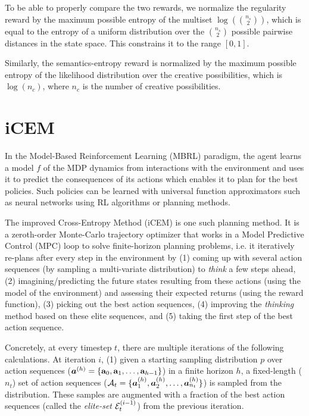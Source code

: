 To be able to properly compare the two rewards, we normalize the regularity reward by the maximum possible entropy of the multiset \(\log\left(\binom{n_s}{2}\right)\), which is equal to the entropy of a uniform distribution over the \(\binom{n_s}{2}\) possible pairwise distances in the state space.
This constrains it to the range \([0, 1]\).

Similarly, the semantics-entropy reward is normalized by the maximum possible entropy of the likelihood distribution over the creative possibilities, which is \(\log(n_c)\), where \(n_c\) is the number of creative possibilities.

\section{iCEM}
\label{sec:icem}

In the Model-Based Reinforcement Learning (MBRL) paradigm, the agent learns a model \(f\) of the MDP dynamics from interactions with the environment and uses it to predict the consequences of its actions which enables it to plan for the best policies.
Such policies can be learned with universal function approximators such as neural networks using RL algorithms or planning methods.

The improved Cross-Entropy Method (iCEM) is one such planning method.
It is a zeroth-order Monte-Carlo trajectory optimizer that works in a Model Predictive Control (MPC) loop to solve finite-horizon planning problems, i.e. it iteratively re-plans after every step in the environment by (1) coming up with several action sequences (by sampling a multi-variate distribution) to \emph{think} a few steps ahead, (2) imagining/predicting the future states resulting from these actions (using the model of the environment) and assessing their expected returns (using the reward function), (3) picking out the best action sequences, (4) improving the \emph{thinking} method based on these elite sequences, and (5) taking the first step of the best action sequence.

Concretely, at every timestep \(t\), there are multiple iterations of the following calculations. At iteration \(i\),
(1) given a starting sampling distribution \(p\) over action sequences (\(\bm{a}^{(h)} = \{ \mathbf{a}_0, \mathbf{a}_1, \ldots, \mathbf{a}_{h-1} \}\)) in a finite horizon \(h\), a fixed-length (\(n_t\)) set of action sequences (\(\mathcal{A}_t = \{ \bm{a}^{(h)}_1, \bm{a}^{(h)}_2, \ldots, \bm{a}^{(h)}_{n_t} \}\)) is sampled from the distribution.
These samples are augmented with a fraction of the best action sequences (called the \emph{elite-set} \(\mathcal{E}_t^{(i-1)}\)) from the previous iteration.

